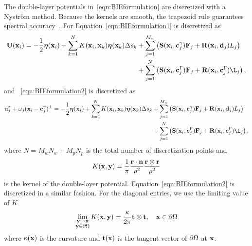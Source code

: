 \documentclass[preprint, 10pt]{elsarticle}
\begin{document}
The double-layer potentials in~\eqref{eqn:BIEformulation} are
discretized with a Nystr\"om method.  Because the kernels are smooth,
the trapezoid rule guarantees spectral accuracy~\cite{tre-wei2014}.  For
Equation~\eqref{eqn:BIEformulation1} is discretized as
\begin{equation*}
  \begin{aligned}
  \UU(\xx_i) = -\frac{1}{2}\eeta(\xx_i) + 
  \sum_{k=1}^{N} K(\xx_i,\xx_k) \eeta(\xx_k) \Delta s_k
    &+ \sum_{j=1}^{M_w} \left(\mathbf{S}(\xx_i,\cc^\gamma_j)\FF_j +
    \mathbf{R}(\xx_i,\dd_j)L_j\right)  \\
    &+ \sum_{j=1}^{N} \left(\mathbf{S}(\xx_i,\cc^\Gamma_j)\FF_j +
    \mathbf{R}(\xx_i,\cc^\Gamma_j)\L_j\right),
  \end{aligned}
\end{equation*}
and ~\eqref{eqn:BIEformulation2} is discretized as
\begin{equation*}
  \begin{aligned}
  \uu^\tau_j + \omega_j(\xx_i - \cc^\gamma_j)^\perp = -\frac{1}{2}\eeta(\xx_i) + 
  \sum_{k=1}^{N} K(\xx_i,\xx_k) \eeta(\xx_k) \Delta s_k
    &+ \sum_{j=1}^{M_w} \left(\mathbf{S}(\xx_i,\cc^\gamma_j)\FF_j +
    \mathbf{R}(\xx_i,\dd_j)L_j\right)  \\
    &+ \sum_{j=1}^{N} \left(\mathbf{S}(\xx_i,\cc^\Gamma_j)\FF_j +
    \mathbf{R}(\xx_i,\cc^\Gamma_j)\L_j\right),
  \end{aligned}
\end{equation*}
where $N = M_w N_w + M_p N_p$ is the total number of discretization
points and
\begin{align*}
  K({\mathbf{x}},{\mathbf{y}}) = \frac{1}{\pi} \frac{{\mathbf{r}} \cdot {\mathbf{n}}}{\rho^2} 
               \frac{{\mathbf{r}} \otimes {\mathbf{r}}}{\rho^2}
\end{align*}
is the kernel of the double-layer potential.
Equation~\eqref{eqn:BIEformulation2} is discretized in a similar
fashion.  For the diagonal entries, we use the limiting value of $K$
\begin{align*}
  \lim_{\substack{{\mathbf{y}} \rightarrow {\mathbf{x}} \\ {\mathbf{y}} \in {\partial}\Omega}} 
    K({\mathbf{x}},{\mathbf{y}}) = \frac{\kappa}{2\pi}{\mathbf{t}}\otimes{\mathbf{t}},
    \quad {\mathbf{x}} \in {\partial}\Omega
\end{align*}
where $\kappa({\mathbf{x}})$ is the curvature and ${\mathbf{t}}({\mathbf{x}})$ is the tangent
vector of ${\partial}\Omega$ at ${\mathbf{x}}$.
\end{document}
